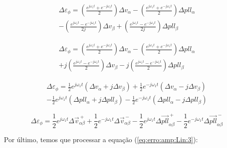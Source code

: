 \documentclass[12pt,a4paper]{report}
\begin{document}
{
\color{blue}

\begin{multline}
\Delta \varepsilon_\phi = 
\left(
\frac{e^{j\omega_1 t} + e^{-j\omega_1 t}}{2}
\right)
\Delta v_{\alpha} 
- \left(
\frac{e^{j\omega_1 t} + e^{-j\omega_1 t}}{2}
\right)
\Delta pll_\alpha \\
- \left(
\frac{e^{j\omega_1 t} - e^{-j\omega_1 t}}{2j}
\right) 
\Delta v_\beta 
+ \left(
\frac{e^{j\omega_1 t} - e^{-j\omega_1 t}}{2j}
\right) 
\Delta pll_\beta
\end{multline}


\begin{multline}
\Delta \varepsilon_\phi = 
\left(
\frac{e^{j\omega_1 t} + e^{-j\omega_1 t}}{2}
\right)
\Delta v_{\alpha} 
- \left(
\frac{e^{j\omega_1 t} + e^{-j\omega_1 t}}{2}
\right)
\Delta pll_\alpha \\
+ j\left(
\frac{e^{j\omega_1 t} - e^{-j\omega_1 t}}{2}
\right) 
\Delta v_\beta 
- j\left(
\frac{e^{j\omega_1 t} - e^{-j\omega_1 t}}{2}
\right) 
\Delta pll_\beta
\end{multline}



\begin{multline}
\Delta \varepsilon_\phi =
\frac{1}{2} e^{j\omega_1 t}
( \Delta v_{\alpha}  + j\Delta v_{\beta} )
+\frac{1}{2} e^{-j\omega_1 t}
( \Delta v_{\alpha}  - j\Delta v_{\beta} )\\
-\frac{1}{2} e^{j\omega_1 t}
( \Delta pll_{\alpha}  + j\Delta pll_{\beta} )
-\frac{1}{2} e^{-j\omega_1 t}
( \Delta pll_{\alpha}  - j\Delta pll_{\beta} )
\end{multline}


}



\begin{equation}
\Delta \varepsilon_\phi =
\frac{1}{2} e^{j\omega_1 t}
\Delta \vec{v}_{\alpha\beta}^{~+}
+\frac{1}{2} e^{-j\omega_1 t}
\Delta \vec{v}_{\alpha\beta}^{~-}
-\frac{1}{2} e^{j\omega_1 t}
\Delta \vec{pll}_{\alpha\beta}^{~+}
-\frac{1}{2} e^{-j\omega_1 t}
\Delta \vec{pll}_{\alpha\beta}^{~-}
\end{equation}



Por último, temos que processar a equação (\ref{eq:erro:amp:Lin:3}):
\end{document}
